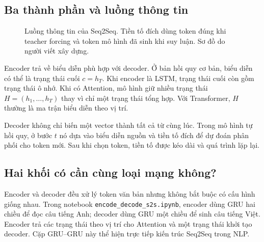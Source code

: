 \documentclass[11pt,a4paper]{article}
\numberwithin{equation}{section}
\newcommand{\BOS}{\langle\mathrm{BOS}\rangle}
\begin{document}
\subsection{Ba thành phần và luồng thông tin}
\begin{figure}[H]
\centering
{}
\caption{Luồng thông tin của Seq2Seq. Tiền tố đích dùng token đúng khi teacher forcing và token mô hình đã sinh khi suy luận. Sơ đồ do người viết xây dựng.}
\label{fig:overview}
\end{figure}
Encoder trả về biểu diễn phù hợp với decoder. Ở bản hồi quy cơ bản, biểu diễn có thể là trạng thái cuối $c=h_T$. Khi encoder là LSTM, trạng thái cuối còn gồm trạng thái ô nhớ. Khi có Attention, mô hình giữ nhiều trạng thái $H=(h_1,\ldots,h_T)$ thay vì chỉ một trạng thái tổng hợp. Với Transformer, $H$ thường là ma trận biểu diễn theo vị trí.

Decoder không chỉ biến một vector thành tất cả từ cùng lúc. Trong mô hình tự hồi quy, ở bước $t$ nó dựa vào biểu diễn nguồn và tiền tố đích để dự đoán phân phối cho token mới. Sau khi chọn token, tiền tố được kéo dài và quá trình lặp lại.

\subsection{Hai khối có cần cùng loại mạng không?}
Encoder và decoder đều xử lý token văn bản nhưng không bắt buộc có cấu hình giống nhau. Trong notebook \texttt{encode\_decode\_s2s.ipynb}, encoder dùng GRU hai chiều để đọc câu tiếng Anh; decoder dùng GRU một chiều để sinh câu tiếng Việt. Encoder trả các trạng thái theo vị trí cho Attention và một trạng thái khởi tạo decoder. Cặp GRU--GRU này thể hiện trực tiếp kiến trúc Seq2Seq trong NLP.
\end{document}
